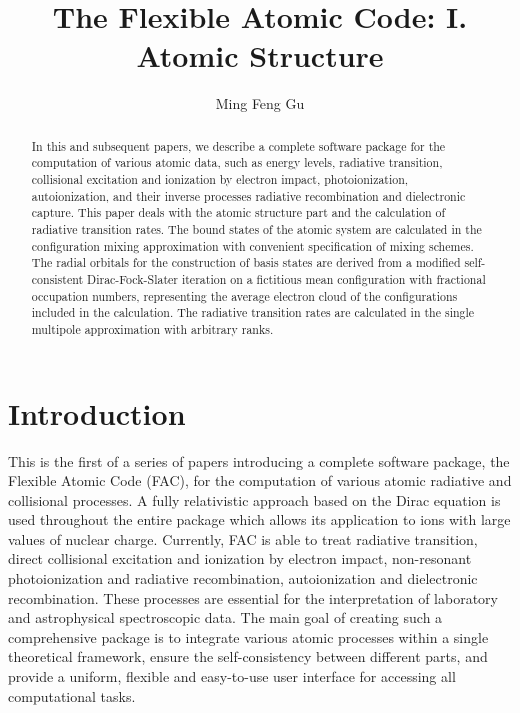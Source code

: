 \documentclass[preprint, floatfix, pra, showpacs, showkeys]{revtex4}
\begin{document}
\title{The Flexible Atomic Code: I. Atomic Structure} 
\author{Ming Feng Gu}

\begin{abstract}
In this and subsequent papers, we describe a complete software package for
the computation of various atomic data, such as energy levels,
radiative transition, collisional excitation and ionization by electron impact,
photoionization, autoionization, and their inverse processes radiative
recombination and dielectronic capture. 
This paper deals with the atomic structure part
and the calculation of radiative transition rates. The bound states of the
atomic system are calculated in the configuration mixing approximation with
convenient specification of mixing schemes. The radial orbitals for the
construction of basis states are derived from a modified self-consistent
Dirac-Fock-Slater 
iteration on a fictitious mean configuration with fractional occupation
numbers, representing the average electron cloud of the configurations
included in the calculation. The radiative transition rates are calculated in
the single multipole approximation with arbitrary ranks.
\end{abstract}


\maketitle

\section{Introduction}
This is the first of a series of papers introducing a complete software
package, the Flexible Atomic Code (FAC), for the computation of various atomic
radiative and collisional processes. A fully relativistic approach based on
the Dirac equation is used throughout the entire package which allows its
application to ions with large values of nuclear charge. Currently, FAC
is able to treat radiative transition, direct collisional excitation and
ionization by electron impact, non-resonant photoionization and radiative
recombination, autoionization and dielectronic recombination. These processes
are essential for the interpretation of laboratory and astrophysical 
spectroscopic data. The main goal of creating such a comprehensive package is
to integrate various atomic processes within a single theoretical framework,
ensure the self-consistency between different parts, and provide a uniform,
flexible and easy-to-use user interface for accessing all computational tasks. 
\end{document}
